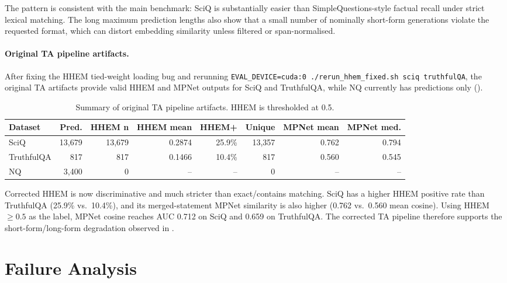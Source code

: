 \documentclass[11pt,a4paper]{article}
\begin{document}
The pattern is consistent with the main benchmark: SciQ is substantially easier
than SimpleQuestions-style factual recall under strict lexical matching.  The long
maximum prediction lengths also show that a small number of nominally short-form
generations violate the requested format, which can distort embedding similarity
unless filtered or span-normalised.

\paragraph{Original TA pipeline artifacts.}
After fixing the HHEM tied-weight loading bug and rerunning
\texttt{EVAL\_DEVICE=cuda:0 ./rerun\_hhem\_fixed.sh sciq truthfulQA}, the
original TA artifacts provide valid HHEM and MPNet outputs for SciQ and
TruthfulQA, while NQ currently has predictions only ().

\begin{table}[ht]
\centering
\caption{Summary of original TA pipeline artifacts. HHEM is thresholded at 0.5.}
\label{tab:ta-original}
\small
\setlength{\tabcolsep}{4pt}
\begin{tabular}{lrrrrrrr}
\toprule
\textbf{Dataset} & \textbf{Pred.} & \textbf{HHEM n} & \textbf{HHEM mean}
  & \textbf{HHEM+} & \textbf{Unique} & \textbf{MPNet mean} & \textbf{MPNet med.} \\
\midrule
SciQ       & 13,679 & 13,679 & 0.2874 & 25.9\% & 13,357 & 0.762 & 0.794 \\
TruthfulQA &    817 &    817 & 0.1466 & 10.4\% &    817 & 0.560 & 0.545 \\
NQ         &  3,400 &      0 & --     & --      & 0 & --    & --    \\
\bottomrule
\end{tabular}
\end{table}

Corrected HHEM is now discriminative and much stricter than exact/contains
matching.  SciQ has a higher HHEM positive rate than TruthfulQA (25.9\% vs.\
10.4\%), and its merged-statement MPNet similarity is also higher (0.762 vs.\
0.560 mean cosine).  Using HHEM $\ge 0.5$ as the label, MPNet cosine reaches
AUC 0.712 on SciQ and 0.659 on TruthfulQA.  The corrected TA pipeline therefore
supports the short-form/long-form degradation observed in .

\section{Failure Analysis}
\label{sec:failure}
\end{document}
